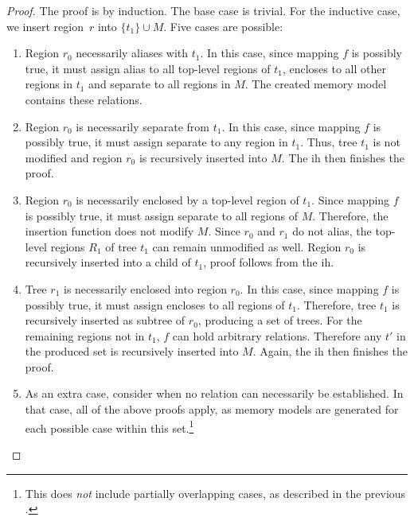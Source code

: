 \begin{proof}
  The proof is by induction.
  The base case is trivial.
  For the inductive case, we insert region~$r$ into $\{t_1\} \cup M$.
  Five cases are possible:
  \begin{enumerate}
    \item Region $r_0$ necessarily aliases with $t_1$.
    In this case, since mapping $f$ is possibly true, it must assign \gls{alias} to all top-level regions of $t_1$, \gls{encloses} to all other regions in $t_1$ and \gls{separate} to all regions in $M$.
    The created memory model contains these relations.
    \item Region $r_0$ is necessarily separate from $t_1$.
    In this case, since mapping $f$ is possibly true, it must assign \gls{separate} to any region in $t_1$.
    Thus, tree $t_1$ is not modified and region $r_0$ is recursively inserted into $M$.
    The \ac{ih} then finishes the proof.
    \item Region $r_0$ is necessarily enclosed by a top-level region of $t_1$.
    Since mapping $f$ is possibly true, it must assign \gls{separate} to all regions of $M$.
    Therefore, the insertion function does not modify $M$.
    Since $r_0$ and $r_1$ do not alias, the top-level regions $R_1$ of tree $t_1$ can remain unmodified as well.
    Region $r_0$ is recursively inserted into a child of $t_1$, proof follows from the \ac{ih}.
    \item Tree $r_1$ is necessarily enclosed into region $r_0$.
    In this case, since mapping $f$ is possibly true, it must assign \gls{encloses} to all regions of $t_1$.
    Therefore, tree $t_1$ is recursively inserted as subtree of $r_0$, producing a set of trees.
    For the remaining regions not in $t_1$, $f$ can hold arbitrary relations.
    Therefore any $t'$ in the produced set is recursively inserted into $M$.
    Again, the \ac{ih} then finishes the proof.
    \item As an extra case, consider when no relation can necessarily be established. In that case, all of the above proofs apply, as memory models are generated for each possible case within this set.\footnote{%
      This does \emph{not} include partially overlapping cases, as described in the previous .%
    }\qedhere %
  \end{enumerate}
\end{proof}

